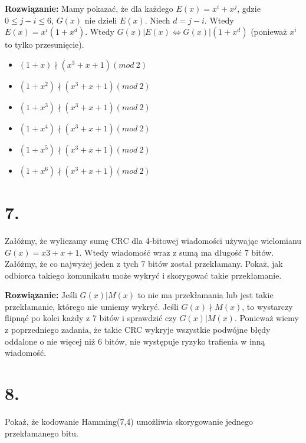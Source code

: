 \documentclass{article}
\begin{document}
\textbf{Rozwiązanie:} Mamy pokazać, że dla każdego $E(x) = x^i + x^j$, gdzie $0 \leq j-i \leq 6$, $G(x)$ nie dzieli $E(x)$. Niech $d = j-i$. Wtedy $E(x) = x^i(1+x^d)$. Wtedy $G(x) | E(x) \iff G(x) | (1+x^d)$ (ponieważ $x^i$ to tylko przesunięcie). \begin{itemize}
    \item $(1+x) \nmid (x^3 + x + 1) (mod\ 2)$
    \item $(1+x^2) \nmid (x^3 + x + 1) (mod\ 2)$
    \item $(1+x^3) \nmid (x^3 + x + 1) (mod\ 2)$
    \item $(1+x^4) \nmid (x^3 + x + 1) (mod\ 2)$
    \item $(1+x^5) \nmid (x^3 + x + 1) (mod\ 2)$
    \item $(1+x^6) \nmid (x^3 + x + 1) (mod\ 2)$
\end{itemize}

\section*{7.}
Załóżmy, że wyliczamy sumę CRC dla 4-bitowej wiadomości używając wielomianu $G (x) = x3 + x + 1$. Wtedy wiadomość wraz z sumą ma długość 7 bitów. Załóżmy, że co najwyżej jeden z tych 7 bitów został przekłamany. Pokaż, jak odbiorca takiego komunikatu może wykryć i skorygować takie przekłamanie.

\textbf{Rozwiązanie:} Jeśli $G(x) | M(x)$ to nie ma przekłamania lub jest takie przekłamanie, którego nie umiemy wykryć. Jeśli $G(x) \nmid M(x)$, to wystarczy flipnąć po kolei każdy z 7 bitów i sprawdzić czy $G(x) |
 M(x)$. Ponieważ wiemy z poprzedniego zadania, że takie CRC wykryje wszystkie podwójne błędy oddalone o nie więcej niż 6 bitów, nie występuje ryzyko trafienia w inną wiadomość.

\section*{8.}
Pokaż, że kodowanie Hamming(7,4) umożliwia skorygowanie jednego przekłamanego bitu.
\end{document}
